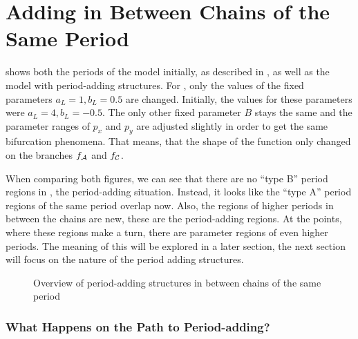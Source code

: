 \section{Adding in Between Chains of the Same Period}

 shows both the periods of the model initially, as described in , as well as the model with period-adding structures.
For , only the values of the fixed parameters $a_L = 1, b_L = 0.5$ are changed.
Initially, the values for these parameters were $a_L = 4, b_L = -0.5$.
The only other fixed parameter $B$ stays the same and the parameter ranges of $p_x$ and $p_y$ are adjusted slightly in order to get the same bifurcation phenomena.
That means, that the shape of the function only changed on the branches $f_{\mathcal{A}}$ and $f_{\mathcal{C}}$.

When comparing both figures, we can see that there are no ``type B'' period regions in , the period-adding situation.
Instead, it looks like the ``type A'' period regions of the same period overlap now.
Also, the regions of higher periods in between the chains are new, these are the period-adding regions.
At the points, where these regions make a turn, there are parameter regions of even higher periods.
The meaning of this will be explored in a later section, the next section will focus on the nature of the period adding structures.

\begin{figure}
    \centering
    \caption{Overview of period-adding structures in between chains of the same period}
    \label{fig:minrep.adding1.overview}
\end{figure}




\subsubsection{What Happens on the Path to Period-adding?}


